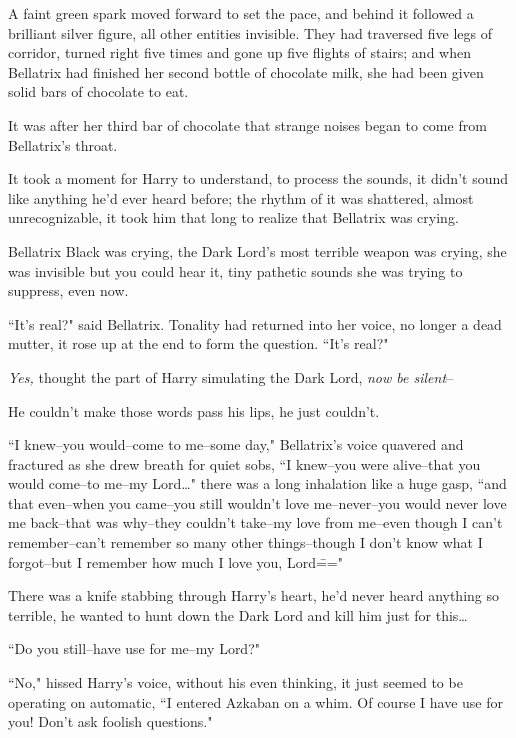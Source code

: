 
\lettrine{A}{} faint green spark moved forward to set the pace, and behind it followed a brilliant silver figure, all other entities invisible. They had traversed five legs of corridor, turned right five times and gone up five flights of stairs; and when Bellatrix had finished her second bottle of chocolate milk, she had been given solid bars of chocolate to eat.

It was after her third bar of chocolate that strange noises began to come from Bellatrix's throat.

It took a moment for Harry to understand, to process the sounds, it didn't sound like anything he'd ever heard before; the rhythm of it was shattered, almost unrecognizable, it took him that long to realize that Bellatrix was crying.

Bellatrix Black was crying, the Dark Lord's most terrible weapon was crying, she was invisible but you could hear it, tiny pathetic sounds she was trying to suppress, even now.

``It's real?" said Bellatrix. Tonality had returned into her voice, no longer a dead mutter, it rose up at the end to form the question. ``It's real?"

\emph{Yes,} thought the part of Harry simulating the Dark Lord, \emph{now be silent}\---

He couldn't make those words pass his lips, he just couldn't.

``I knew\---you would\---come to me\---some day," Bellatrix's voice quavered and fractured as she drew breath for quiet sobs, ``I knew\---you were alive\---that you would come\---to me\---my Lord{\ldots}" there was a long inhalation like a huge gasp, ``and that even\---when you came\---you still wouldn't love me\---never\---you would never love me back\---that was why\---they couldn't take\---my love from me\---even though I can't remember\---can't remember so many other things\---though I don't know what I forgot\---but I remember how much I love you, Lord\==="

There was a knife stabbing through Harry's heart, he'd never heard anything so terrible, he wanted to hunt down the Dark Lord and kill him just for this{\ldots}

``Do you still\---have use for me\---my Lord?"

``No," hissed Harry's voice, without his even thinking, it just seemed to be operating on automatic, ``I entered Azkaban on a whim. Of course I have use for you! Don't ask foolish questions."

